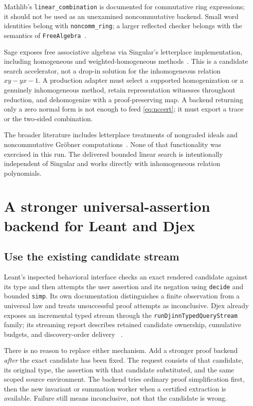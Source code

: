 \documentclass[11pt,letterpaper]{article}
\newcommand{\code}[1]{\texttt{#1}}
\theoremstyle{definition}\newtheorem{definition}[theorem]{Definition}
\theoremstyle{remark}\newtheorem{remark}[theorem]{Remark}
\begin{document}
Mathlib's \code{linear\_combination} is documented for commutative ring
expressions; it should not be used as an unexamined noncommutative backend.
Small word identities belong with \code{noncomm\_ring}; a larger reflected
checker belongs with the semantics of \code{FreeAlgebra}~\cite{linear-combination,
noncomm-ring,free-algebra}.

Sage exposes free associative algebras via Singular's letterplace implementation,
including homogeneous and weighted-homogeneous methods~\cite{letterplace}.
This is a candidate search accelerator, not a drop-in solution for the
inhomogeneous relation $xy-yx-1$. A production adapter must select a supported
homogenization or a genuinely inhomogeneous method, retain representation
witnesses throughout reduction, and dehomogenize with a proof-preserving map.
A backend returning only a zero normal form is not enough to feed
\eqref{eq:nccert}; it must export a trace or the two-sided combination.

The broader literature includes letterplace treatments of nongraded ideals
and noncommutative Gr\"obner computations~\cite{nongraded-letterplace}. None of
that functionality was exercised in this run. The delivered bounded linear
search is intentionally independent of Singular and works directly with
inhomogeneous relation polynomials.

\section{A stronger universal-assertion backend for Leant and Djex}
\label{sec:behavior}

\subsection{Use the existing candidate stream}
Leant's inspected behavioral interface checks an exact rendered candidate
against its type and then attempts the user assertion and its negation using
\code{decide} and bounded \code{simp}. Its own documentation distinguishes a
finite observation from a universal law and treats unsuccessful proof attempts
as inconclusive. Djex already exposes an incremental typed stream through the
\code{runDjinnTypedQueryStream} family; its streaming report describes retained
candidate ownership, cumulative budgets, and discovery-order delivery
~\cite{leant-behavior,djex-stream}.

There is no reason to replace either mechanism. Add a stronger proof backend
\emph{after} the exact candidate has been fixed. The request consists of that
candidate, its original type, the assertion with that candidate substituted,
and the same scoped source environment. The backend tries ordinary proof
simplification first, then the new invariant or summation worker when a
certified extraction is available. Failure still means inconclusive, not that
the candidate is wrong.
\end{document}
